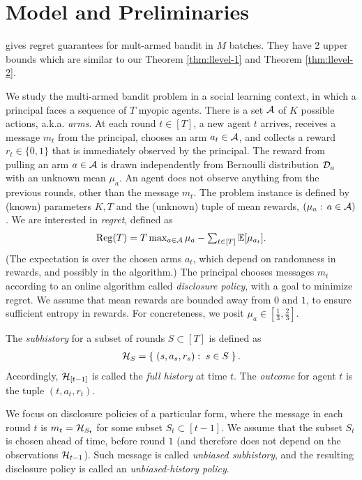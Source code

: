 \section{Model and Preliminaries}
\label{sec:model}
\cite{Perchet2015BatchedBP} gives regret guarantees for mult-armed bandit in $M$ batches. They have 2 upper bounds which are similar to our Theorem \ref{thm:llevel-1} and Theorem \ref{thm:llevel-2}.

We study the multi-armed bandit problem in a social learning context, in which a principal faces a sequence of $T$ myopic agents. There is a set $\mathcal{A}$ of $K$ possible actions, a.k.a. \emph{arms}. At each round $t\in [T]$, a new agent $t$ arrives, receives a message $m_t$ from the principal, chooses an arm $a_t\in \mathcal{A}$, and collects a reward $r_t\in \{0,1\}$ that is immediately observed by the principal. The reward from pulling an arm $a\in \mathcal{A}$ is drawn independently from Bernoulli distribution $\mathcal{D}_a$ with an unknown mean $\mu_a$. An agent does not observe anything from the previous rounds, other than the message $m_t$. The problem instance is defined by (known) parameters $K,T$ and the (unknown) tuple of mean rewards, $(\mu_a:\,a\in\mathcal{A})$. We are interested in \emph{regret}, defined as
\begin{align}\label{eq:intro-regret-defn}
\textstyle
  \mathrm{Reg}(T)
  = T \max_{a\in \mathcal{A}} \mu_a -
  \sum_{t\in [T]} \mathbb{E}[\mu_{a_t}].
\end{align}
(The expectation is over the chosen arms $a_t$, which depend on randomness in rewards, and possibly in the algorithm.)
The principal chooses messages $m_t$ according to an online algorithm called \emph{disclosure policy}, with a goal to minimize regret. We assume that mean rewards are bounded away from $0$ and $1$, to ensure sufficient entropy in rewards. For concreteness, we posit
    $\mu_a\in [\tfrac13,\tfrac23]$.

The \emph{subhistory} for a subset of rounds $S\subset [T]$ is defined as
\begin{align} \label{eq:model-subhistory}
    \mathcal{H}_{S} = \left\{\; (s,a_s,r_s):\;s\in S \;\right\}.
\end{align}
Accordingly, $\mathcal{H}_{[t-1]}$ is called the \emph{full history} at time $t$.
The \emph{outcome} for agent $t$ is the tuple $(t,a_t,r_t)$.


We focus on disclosure policies of a particular form, where the message in each round $t$ is $m_t = \mathcal{H}_{S_t}$ for some subset $S_t\subset [t-1]$. We assume that the subset $S_t$ is chosen ahead of time, before round $1$ (and therefore does not depend on the observations $\mathcal{H}_{t-1}$). Such message is called \emph{unbiased subhistory}, and the resulting disclosure policy is called an \emph{unbiased-history policy}.

